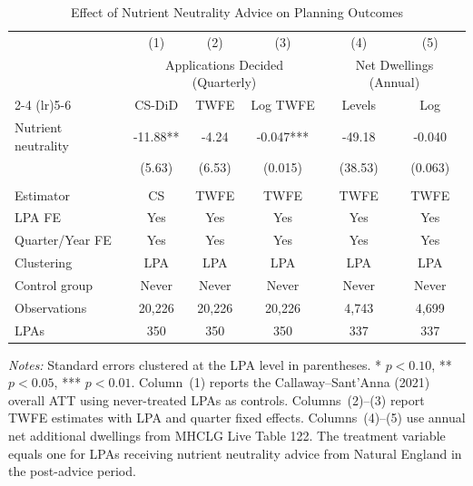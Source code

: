 \begin{table}[H]
\centering
\caption{Effect of Nutrient Neutrality Advice on Planning Outcomes}
\begin{threeparttable}
\begin{tabular}{lccccc}
\toprule
& (1) & (2) & (3) & (4) & (5) \\
& \multicolumn{3}{c}{Applications Decided (Quarterly)} & \multicolumn{2}{c}{Net Dwellings (Annual)} \\
\cmidrule(lr){2-4} \cmidrule(lr){5-6}
& {CS-DiD} & {TWFE} & {Log TWFE} & {Levels} & {Log} \\
\midrule
Nutrient neutrality & -11.88** & -4.24 & -0.047*** & -49.18 & -0.040 \\
& (5.63) & (6.53) & (0.015) & (38.53) & (0.063) \\
\\
Estimator & {CS} & {TWFE} & {TWFE} & {TWFE} & {TWFE} \\
LPA FE & {Yes} & {Yes} & {Yes} & {Yes} & {Yes} \\
Quarter/Year FE & {Yes} & {Yes} & {Yes} & {Yes} & {Yes} \\
Clustering & {LPA} & {LPA} & {LPA} & {LPA} & {LPA} \\
Control group & {Never} & {Never} & {Never} & {Never} & {Never} \\
Observations & 20,226 & 20,226 & 20,226 & 4,743 & 4,699 \\
LPAs & 350 & 350 & 350 & 337 & 337 \\
\bottomrule
\end{tabular}
\begin{tablenotes}[flushleft]
\small
\item \textit{Notes:} Standard errors clustered at the LPA level in parentheses. * $p<0.10$, ** $p<0.05$, *** $p<0.01$. Column~(1) reports the Callaway--Sant'Anna (2021) overall ATT using never-treated LPAs as controls. Columns~(2)--(3) report TWFE estimates with LPA and quarter fixed effects. Columns~(4)--(5) use annual net additional dwellings from MHCLG Live Table 122. The treatment variable equals one for LPAs receiving nutrient neutrality advice from Natural England in the post-advice period.
\end{tablenotes}
\end{threeparttable}
\label{tab:main}
\end{table}
